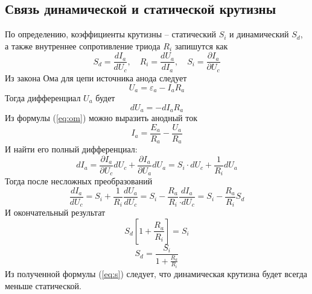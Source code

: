 \documentclass[a4paper,12pt]{extarticle}%
\begin{document}
\subsection{Связь динамической и статической крутизны}
По определению, коэффициенты крутизны -- статический $S_i$ и динамический $S_d$, а также внутреннее сопротивление триода $R_i$ запишутся как
\begin{equation}
	S_d=\frac{dI_a}{dU_c}, \quad
	R_i=\frac{dU_a}{dI_a},	\quad
	S_i=\frac{\partial I_a}{\partial U_c}
\end{equation}
Из закона Ома для цепи источника анода следует
\begin{equation}
	\label{eq:om}
	U_a=\varepsilon_a-I_a R_a
\end{equation}
Тогда дифференциал $U_a$ будет
\begin{equation}
	dU_a=-dI_aR_a
\end{equation}
Из формулы (\ref{eq:om}) можно выразить анодный ток
\begin{equation}
	I_a=\frac{E_a}{R_a}-\frac{U_a}{R_a}
\end{equation}
И найти его полный дифференциал:
\begin{equation}
	dI_a=
	\frac{\partial I_a}{\partial U_c}dU_c+
	\frac{\partial I_a}{\partial U_a}dU_a=
	S_i\cdot dU_c+\frac{1}{R_i}dU_a
\end{equation}
Тогда после несложных преобразований
\begin{equation}
	\frac{dI_a}{dU_c}=
	S_i+
	\frac{1}{R_i}\frac{dU_a}{dU_c}=
	S_i-
	\frac{R_a}{R_i}\frac{dI_a}{\cdot dU_c}=
	S_i-\frac{R_a}{R_i}S_d
\end{equation}
И окончательный результат
\begin{equation}
	S_d
	\left[
		1+\frac{R_a}{R_i}
	\right]
	=S_i
\end{equation}
\begin{equation}
	\label{eq:s}
	S_d=\frac
	{  
		S_i
	}
	{
		1+\frac{R_a}{R_i}
	}
\end{equation}
Из полученной формулы (\ref{eq:s}) следует, что динамическая крутизна будет всегда меньше статической.


% 	





% 	
\end{document}

